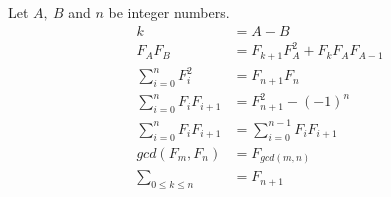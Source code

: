 Let \(A, \ B\) and \(n\) be integer numbers.
\begin{align}
    k &= A-B \\
    F_A F_B &= F_{k+1}F_{A}^2 + F_k F_A F_{A-1} \\ 
    \displaystyle\sum_{i = 0}^{n} F_i^2 &= F_{n+1}F_n \\ 
    \displaystyle\sum_{i=0}^{n} F_i F_{i+1} &= F_{n+1}^2 - (-1)^n \\ 
    \displaystyle\sum_{i= 0}^{n} F_i F_{i+1} &= \displaystyle\sum_{i = 0}^{n-1} F_i F_{i+1} \\ 
    gcd(F_m, F_n) &= F_{gcd(m,n)} \\ 
    \displaystyle\sum_{0 \leq k \leq n} &= F_{n+1}\\  
\end{align}